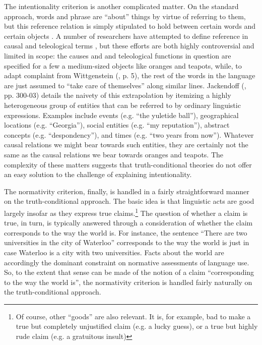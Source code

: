 The intentionality criterion is another complicated matter. On the standard approach, words and phrase are ``about'' things by virtue of referring to them, but this reference relation is simply stipulated to hold between certain words and certain objects \citep{Stanley:2008}. A number of researchers have attempted to define reference in causal and teleological terms \citep{Speaks:2014,Dennett:1987,Millikan:1989}, but these efforts are both highly controversial \citep{Horwich:2005} and limited in scope: the causes and and teleological functions in question are specified for a few a medium-sized objects like oranges and teapots, while, to adapt complaint from Wittgenstein (\citeyear{Wittgenstein:1953}, p. 5), the rest of the words in the language are just assumed to ``take care of themselves'' along similar lines. Jackendoff (\citeyear{Jackendoff:2002}, pp. 300-03) details the naivety of this extrapolation by itemizing a highly heterogeneous group of entities that can be referred to by ordinary linguistic expressions. Examples include events (e.g. ``the yuletide ball''), geographical locations (e.g. ``Georgia''), social entities (e.g. ``my reputation''), abstract concepts (e.g. ``despondency''), and times (e.g. ``two years from now''). Whatever causal relations we might bear towards such entities, they are certainly not the same as the causal relations we bear towards oranges and teapots. The complexity of these matters suggests that truth-conditional theories do not offer an easy solution to the challenge of explaining intentionality.

The normativity criterion, finally, is handled in a fairly straightforward manner on the truth-conditional approach. The basic idea is that linguistic acts are good largely insofar as they express true claims.\footnote{Of course, other ``goods'' are also relevant. It is, for example, bad to make a true but completely unjustified claim (e.g. a lucky guess), or a true but highly rude claim (e.g. a gratuitous insult)} The question of whether a claim is true, in turn, is typically answered through a consideration of whether the claim corresponds to the way the world is. For instance, the sentence ``There are two universities in the city of Waterloo'' corresponds to the way the world is just in case Waterloo is a city with two universities. Facts about the world are accordingly the dominant constraint on normative assessments of language use. So, to the extent that sense can be made of the notion of a claim ``corresponding to the way the world is'', the normativity criterion is handled fairly naturally on the truth-conditional approach.

